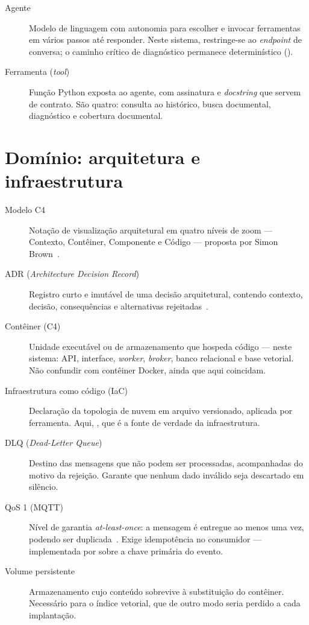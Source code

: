 \begin{description}
  \item[Agente] Modelo de linguagem com autonomia para escolher e invocar
    ferramentas em vários passos até responder. Neste sistema, restringe-se ao
    \textit{endpoint} de conversa; o caminho crítico de diagnóstico permanece
    determinístico ().

  \item[Ferramenta (\textit{tool})] Função Python exposta ao agente, com
    assinatura e \textit{docstring} que servem de contrato. São quatro:
    consulta ao histórico, busca documental, diagnóstico e cobertura documental.
\end{description}

\section{Domínio: arquitetura e infraestrutura}

\begin{description}
  \item[Modelo C4] Notação de visualização arquitetural em quatro níveis de
    zoom --- Contexto, Contêiner, Componente e Código ---
    proposta por Simon Brown~\cite{brown2026c4}.

  \item[ADR (\textit{Architecture Decision Record})] Registro curto e imutável
    de uma decisão arquitetural, contendo contexto, decisão, consequências e
    alternativas rejeitadas~\cite{nygard2011adr}.

  \item[Contêiner (C4)] Unidade executável ou de armazenamento que hospeda
    código --- neste sistema: API, interface, \textit{worker}, \textit{broker},
    banco relacional e base vetorial. Não confundir com contêiner Docker, ainda
    que aqui coincidam.

  \item[Infraestrutura como código (IaC)] Declaração da topologia de nuvem em
    arquivo versionado, aplicada por ferramenta. Aqui,
    , que é a fonte de verdade da infraestrutura.

  \item[DLQ (\textit{Dead-Letter Queue})] Destino das mensagens que não podem
    ser processadas, acompanhadas do motivo da rejeição. Garante que nenhum
    dado inválido seja descartado em silêncio.

  \item[QoS 1 (MQTT)] Nível de garantia \textit{at-least-once}: a mensagem é
    entregue ao menos uma vez, podendo ser duplicada~\cite{oasis2019mqtt}. Exige
    idempotência no consumidor --- implementada por  sobre a
    chave primária do evento.

  \item[Volume persistente] Armazenamento cujo conteúdo sobrevive à
    substituição do contêiner. Necessário para o índice vetorial, que de outro
    modo seria perdido a cada implantação.
\end{description}
